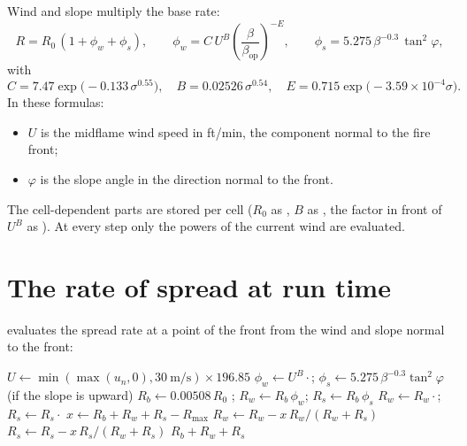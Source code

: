 Wind and slope multiply the base rate:
\begin{equation}
  R = R_0\,(1 + \phi_w + \phi_s), \qquad
  \phi_w = C\,U^{B}\left(\frac{\beta}{\beta_{\mathrm{op}}}\right)^{-E}, \qquad
  \phi_s = 5.275\,\beta^{-0.3}\,\tan^2\varphi,
\end{equation}
with
\begin{equation}
  C = 7.47\exp\!\bigl(-0.133\,\sigma^{0.55}\bigr), \quad B = 0.02526\,\sigma^{0.54}, \quad
  E = 0.715\exp\!\bigl(-3.59\times10^{-4}\sigma\bigr).
\end{equation}
In these formulas:
\begin{itemize}
  \item $U$ is the midflame wind speed in ft/min, the component normal to the fire front;
  \item $\varphi$ is the slope angle in the direction normal to the front.
\end{itemize}
The cell-dependent parts are stored per cell ($R_0$ as , $B$ as , the factor in front of $U^B$ as
). At every step only the powers of the current wind are evaluated.

\section{The rate of spread at run time}

 evaluates the spread rate at a point of the front from the wind and slope
normal to the front:
\begin{algorithm}[ht]
\caption{ for one point (Rothermel branch, ).}
\label{alg:ros}
\begin{algorithmic}[1]
\State $U \gets \min(\max(u_n, 0), 30\ \text{m/s}) \times 196.85$ 
\State $\phi_w \gets U^{B}\cdot$; \quad $\phi_s \gets 5.275\,\beta^{-0.3}\tan^2\varphi$ (if the slope is upward)
\State $R_b \gets 0.00508\,R_0$ ; \quad $R_w \gets R_b\,\phi_w$; \quad $R_s \gets R_b\,\phi_s$
\State $R_w \gets R_w\cdot$; \quad $R_s \gets R_s\cdot$
\State $x \gets R_b + R_w + R_s - R_{\max}$ 
  \State $R_w \gets R_w - x\,R_w/(R_w + R_s)$
  \State $R_s \gets R_s - x\,R_s/(R_w + R_s)$ 
\EndIf
\State \Return $R_b + R_w + R_s$
\end{algorithmic}
\end{algorithm}

